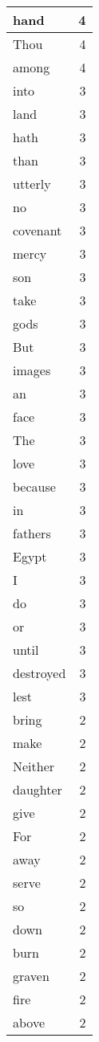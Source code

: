 \begin{center}
\begin{longtable}{l|r}
hand & 4 \\ \hline
Thou & 4 \\ \hline
among & 4 \\ \hline
into & 3 \\ \hline
land & 3 \\ \hline
hath & 3 \\ \hline
than & 3 \\ \hline
utterly & 3 \\ \hline
no & 3 \\ \hline
covenant & 3 \\ \hline
mercy & 3 \\ \hline
son & 3 \\ \hline
take & 3 \\ \hline
gods & 3 \\ \hline
But & 3 \\ \hline
images & 3 \\ \hline
an & 3 \\ \hline
face & 3 \\ \hline
The & 3 \\ \hline
love & 3 \\ \hline
because & 3 \\ \hline
in & 3 \\ \hline
fathers & 3 \\ \hline
Egypt & 3 \\ \hline
I & 3 \\ \hline
do & 3 \\ \hline
or & 3 \\ \hline
until & 3 \\ \hline
destroyed & 3 \\ \hline
lest & 3 \\ \hline
bring & 2 \\ \hline
make & 2 \\ \hline
Neither & 2 \\ \hline
daughter & 2 \\ \hline
give & 2 \\ \hline
For & 2 \\ \hline
away & 2 \\ \hline
serve & 2 \\ \hline
so & 2 \\ \hline
down & 2 \\ \hline
burn & 2 \\ \hline
graven & 2 \\ \hline
fire & 2 \\ \hline
above & 2 \\ \hline

\end{longtable}
\end{center}
